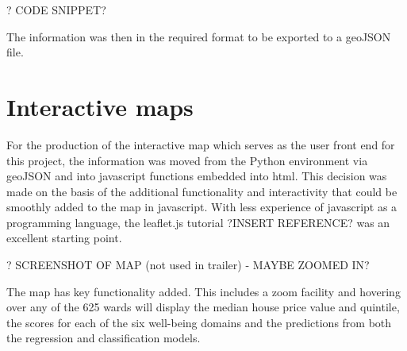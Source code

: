 ? CODE SNIPPET?

The information was then in the required format to be exported to a geoJSON file.


\section{Interactive maps}

For the production of the interactive map which serves as the user front end for this project, the information was moved from the Python environment via geoJSON and into javascript functions embedded into html. This decision was made on the basis of the additional functionality and interactivity that could be smoothly added to the map in javascript. With less experience of javascript as a programming language, the leaflet.js tutorial ?INSERT REFERENCE? was an excellent starting point.

? SCREENSHOT OF MAP (not used in trailer) - MAYBE ZOOMED IN?

The map has key functionality added. This includes a zoom facility and hovering over any of the 625 wards will display the median house price value and quintile, the scores for each of the six well-being domains and the predictions from both the regression and classification models.








